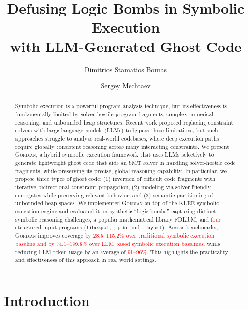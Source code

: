 \documentclass[acmsmall,screen,nonacm]{acmart}
\title[Defusing Logic Bombs in Symbolic Execution with LLM-Generated Ghost Code]{Defusing Logic Bombs in Symbolic Execution\\ with LLM-Generated Ghost Code}
\author{Dimitrios Stamatios Bouras}
\affiliation{%
  \institution{Key Lab of HCST (PKU), MoE, SCS, Peking University}
  \city{Beijing}
  \country{China}
}
\author{Sergey Mechtaev}
\affiliation{%
  \institution{Key Lab of HCST (PKU), MoE, SCS, Peking University}
  \city{Beijing}
  \country{China}}
\newcommand{\rev}[1]{\textcolor{red}{#1}}
\newcommand{\rev}[1]{#1}
\newcommand{\projName}{\textsc{Gordian}\xspace}
\theoremstyle{definition}
\begin{document}
\begin{abstract}
    Symbolic execution is a powerful program analysis technique, but its effectiveness is fundamentally limited by solver-hostile program fragments, complex numerical reasoning, and unbounded heap structures. Recent work proposed replacing constraint solvers with large language models (LLMs) to bypass these limitations, but such approaches struggle to analyze real-world codebases, where deep execution paths require globally consistent reasoning across many interacting constraints. We present \projName, a hybrid symbolic execution framework that uses LLMs selectively to generate lightweight ghost code that aids an SMT solver in handling solver-hostile code fragments, while preserving its precise, global reasoning capability. In particular, we propose three types of ghost code: (1) inversion of difficult code fragments with iterative bidirectional constraint propagation, (2) modeling via solver-friendly surrogates while preserving relevant behavior, and (3) semantic partitioning of unbounded heap spaces. We implemented \projName on top of the KLEE symbolic execution engine and evaluated it on synthetic ``logic bombs'' capturing distinct symbolic reasoning challenges, a popular mathematical library FDLibM, and \rev{four} structured-input programs (\texttt{libexpat}, \texttt{jq}, \texttt{bc} and \texttt{libyaml}). Across benchmarks, \projName{} improves coverage by \rev{28.5--115.2\%  over traditional symbolic execution baseline and by 74.1--189.8\% over LLM-based symbolic execution baselines}, while reducing LLM token usage by an average of \rev{91--96\%}. This highlights the practicality and effectiveness of this approach in real-world settings.
\end{abstract}

\maketitle


\section{Introduction}
\end{document}
